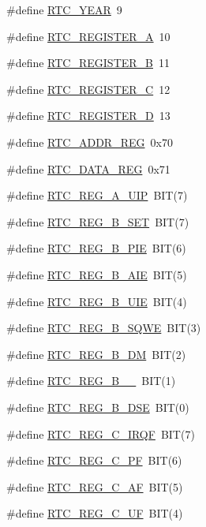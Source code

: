 \begin{DoxyCompactItemize}
\item 
\#define \hyperlink{group__rtc_ga1df5568e6774b73aa4c6e59fc40e9147}{R\+T\+C\+\_\+\+Y\+E\+AR}~9
\item 
\#define \hyperlink{group__rtc_ga81f35849e2c8fe00b1e66b085db986fa}{R\+T\+C\+\_\+\+R\+E\+G\+I\+S\+T\+E\+R\+\_\+A}~10
\item 
\#define \hyperlink{group__rtc_gaa7c10a34d778f2e5bc0f8867ba205f0d}{R\+T\+C\+\_\+\+R\+E\+G\+I\+S\+T\+E\+R\+\_\+B}~11
\item 
\#define \hyperlink{group__rtc_gac1a40b5e35c16b2467bcb5c09a6c1125}{R\+T\+C\+\_\+\+R\+E\+G\+I\+S\+T\+E\+R\+\_\+C}~12
\item 
\#define \hyperlink{group__rtc_ga49ae921cc8c2c61cbbd0b0e779e50057}{R\+T\+C\+\_\+\+R\+E\+G\+I\+S\+T\+E\+R\+\_\+D}~13
\item 
\#define \hyperlink{group__rtc_ga710b98232df2c563009e6f8a6cd18220}{R\+T\+C\+\_\+\+A\+D\+D\+R\+\_\+\+R\+EG}~0x70
\item 
\#define \hyperlink{group__rtc_ga2f258a00c59c3f347c8d2d4a75471ce0}{R\+T\+C\+\_\+\+D\+A\+T\+A\+\_\+\+R\+EG}~0x71
\item 
\#define \hyperlink{group__rtc_ga2d0dea617451446330a89387a9dfed99}{R\+T\+C\+\_\+\+R\+E\+G\+\_\+\+A\+\_\+\+U\+IP}~B\+IT(7)
\item 
\#define \hyperlink{group__rtc_ga0f56a2e4d35b0ad99f8fe85b425f59dc}{R\+T\+C\+\_\+\+R\+E\+G\+\_\+\+B\+\_\+\+S\+ET}~B\+IT(7)
\item 
\#define \hyperlink{group__rtc_ga7a275b39d2b9880655bf653b953b425e}{R\+T\+C\+\_\+\+R\+E\+G\+\_\+\+B\+\_\+\+P\+IE}~B\+IT(6)
\item 
\#define \hyperlink{group__rtc_ga4966ec0df7137606da48c11e339173a8}{R\+T\+C\+\_\+\+R\+E\+G\+\_\+\+B\+\_\+\+A\+IE}~B\+IT(5)
\item 
\#define \hyperlink{group__rtc_gac49ad037dea0a2eac11860a6c01a05a2}{R\+T\+C\+\_\+\+R\+E\+G\+\_\+\+B\+\_\+\+U\+IE}~B\+IT(4)
\item 
\#define \hyperlink{group__rtc_gabc5526120e6a1f035ef362b6f4fa5b63}{R\+T\+C\+\_\+\+R\+E\+G\+\_\+\+B\+\_\+\+S\+Q\+WE}~B\+IT(3)
\item 
\#define \hyperlink{group__rtc_ga9dc43c3d09d5ff86a6ccc538c922de85}{R\+T\+C\+\_\+\+R\+E\+G\+\_\+\+B\+\_\+\+DM}~B\+IT(2)
\item 
\#define \hyperlink{group__rtc_ga5009d8d9738bc5c2a0e1ffcf5845e132}{R\+T\+C\+\_\+\+R\+E\+G\+\_\+\+B\+\_\+\_}~B\+IT(1)
\item 
\#define \hyperlink{group__rtc_ga1fc0acfa01a11ca65cf1e472f4a49e99}{R\+T\+C\+\_\+\+R\+E\+G\+\_\+\+B\+\_\+\+D\+SE}~B\+IT(0)
\item 
\#define \hyperlink{group__rtc_ga38174f5b51b268ab91bc0d9e4f9177c8}{R\+T\+C\+\_\+\+R\+E\+G\+\_\+\+C\+\_\+\+I\+R\+QF}~B\+IT(7)
\item 
\#define \hyperlink{group__rtc_ga4e96da8e6998c6a7b275d8d1d2e21657}{R\+T\+C\+\_\+\+R\+E\+G\+\_\+\+C\+\_\+\+PF}~B\+IT(6)
\item 
\#define \hyperlink{group__rtc_ga5d87d84ef1cc2472d66bea9f1309cd60}{R\+T\+C\+\_\+\+R\+E\+G\+\_\+\+C\+\_\+\+AF}~B\+IT(5)
\item 
\#define \hyperlink{group__rtc_gaf8ce7b20a854a0ce90b2954cc1cef920}{R\+T\+C\+\_\+\+R\+E\+G\+\_\+\+C\+\_\+\+UF}~B\+IT(4)
\end{DoxyCompactItemize}
